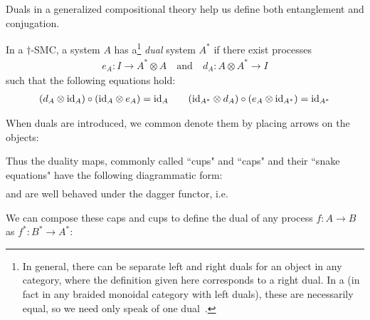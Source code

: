 Duals in a generalized compositional theory help us define both entanglement and conjugation.

\begin{defn}
In a $\dagger$-SMC, a system $A$ has a\footnote{In general, there can be separate left and right duals for an object in any category, where the definition given here corresponds to a right dual. In a \dsmc(in fact in any braided monoidal category with left duals), these are necessarily equal, so we need only speak of one dual~\cite[Prop.~7.2]{joyal1993braided}. } \emph{dual} system $A^*$ if there exist processes 
\begin{align}
e_A:I\to A^*\otimes A \quad \mbox{and}\quad d_A:A\otimes A^*\to I
\end{align}
such that the following equations hold:
\begin{align}
(d_A\otimes \mbox{id}_{A})\circ(\mbox{id}_{A}\otimes e_A) = \mbox{id}_{A} \qquad (\mbox{id}_{A^*}\otimes d_A)\circ(e_A\otimes \mbox{id}_{A^*})=\mbox{id}_{A^*}
\end{align}
\end{defn}

When duals are introduced, we common denote them by placing arrows on the objects:
\begin{equation}

\end{equation}

Thus the duality maps, commonly called ``cups" and ``caps" and their ``snake equations" have the following diagrammatic form:
\begin{align}

\end{align}
\begin{equation}

\end{equation} 
\noindent and are well behaved under the dagger functor, i.e.
\begin{equation}

\end{equation}

We can compose these caps and cups to define the dual of any process $f:A\to B$ as $f^*:B^*\to A^*$:
\begin{equation}

\end{equation}

